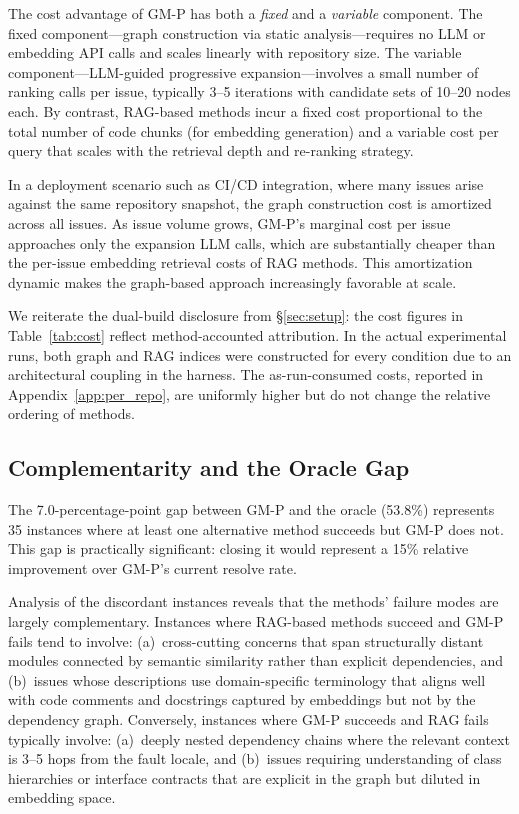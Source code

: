 The cost advantage of GM-P has both a \emph{fixed} and a \emph{variable} component. The fixed component---graph construction via static analysis---requires no LLM or embedding API calls and scales linearly with repository size. The variable component---LLM-guided progressive expansion---involves a small number of ranking calls per issue, typically 3--5 iterations with candidate sets of 10--20 nodes each. By contrast, RAG-based methods incur a fixed cost proportional to the total number of code chunks (for embedding generation) and a variable cost per query that scales with the retrieval depth and re-ranking strategy.

In a deployment scenario such as CI/CD integration, where many issues arise against the same repository snapshot, the graph construction cost is amortized across all issues. As issue volume grows, GM-P's marginal cost per issue approaches only the expansion LLM calls, which are substantially cheaper than the per-issue embedding retrieval costs of RAG methods. This amortization dynamic makes the graph-based approach increasingly favorable at scale.

We reiterate the dual-build disclosure from \S\ref{sec:setup}: the cost figures in Table~\ref{tab:cost} reflect method-accounted attribution. In the actual experimental runs, both graph and RAG indices were constructed for every condition due to an architectural coupling in the harness. The as-run-consumed costs, reported in Appendix~\ref{app:per_repo}, are uniformly higher but do not change the relative ordering of methods.

\subsection{Complementarity and the Oracle Gap}

The 7.0-percentage-point gap between GM-P and the oracle (53.8\%) represents 35 instances where at least one alternative method succeeds but GM-P does not. This gap is practically significant: closing it would represent a 15\% relative improvement over GM-P's current resolve rate.

Analysis of the discordant instances reveals that the methods' failure modes are largely complementary. Instances where RAG-based methods succeed and GM-P fails tend to involve: (a)~cross-cutting concerns that span structurally distant modules connected by semantic similarity rather than explicit dependencies, and (b)~issues whose descriptions use domain-specific terminology that aligns well with code comments and docstrings captured by embeddings but not by the dependency graph. Conversely, instances where GM-P succeeds and RAG fails typically involve: (a)~deeply nested dependency chains where the relevant context is 3--5 hops from the fault locale, and (b)~issues requiring understanding of class hierarchies or interface contracts that are explicit in the graph but diluted in embedding space.

